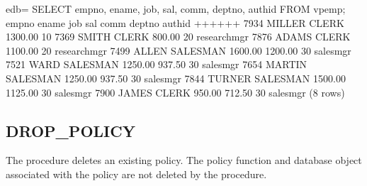 \documentclass[letterpaper,10pt,english,openany,oneside]{sphinxmanual}
\begin{document}
%
\begin{sphinxVerbatim}[commandchars=\\\{\}]
edb=\PYGZsh{} SELECT empno, ename, job, sal, comm, deptno, authid FROM vpemp;
 empno \textbar{} ename  \textbar{}   job    \textbar{}   sal   \textbar{}  comm   \textbar{} deptno \textbar{}   authid
\PYGZhy{}\PYGZhy{}\PYGZhy{}\PYGZhy{}\PYGZhy{}\PYGZhy{}\PYGZhy{}+\PYGZhy{}\PYGZhy{}\PYGZhy{}\PYGZhy{}\PYGZhy{}\PYGZhy{}\PYGZhy{}\PYGZhy{}+\PYGZhy{}\PYGZhy{}\PYGZhy{}\PYGZhy{}\PYGZhy{}\PYGZhy{}\PYGZhy{}\PYGZhy{}\PYGZhy{}\PYGZhy{}+\PYGZhy{}\PYGZhy{}\PYGZhy{}\PYGZhy{}\PYGZhy{}\PYGZhy{}\PYGZhy{}\PYGZhy{}\PYGZhy{}+\PYGZhy{}\PYGZhy{}\PYGZhy{}\PYGZhy{}\PYGZhy{}\PYGZhy{}\PYGZhy{}\PYGZhy{}\PYGZhy{}+\PYGZhy{}\PYGZhy{}\PYGZhy{}\PYGZhy{}\PYGZhy{}\PYGZhy{}\PYGZhy{}\PYGZhy{}+\PYGZhy{}\PYGZhy{}\PYGZhy{}\PYGZhy{}\PYGZhy{}\PYGZhy{}\PYGZhy{}\PYGZhy{}\PYGZhy{}\PYGZhy{}\PYGZhy{}\PYGZhy{}\PYGZhy{}
  7934 \textbar{} MILLER \textbar{} CLERK    \textbar{} 1300.00 \textbar{}         \textbar{}     10 \textbar{}
  7369 \textbar{} SMITH  \textbar{} CLERK    \textbar{}  800.00 \textbar{}         \textbar{}     20 \textbar{} researchmgr
  7876 \textbar{} ADAMS  \textbar{} CLERK    \textbar{} 1100.00 \textbar{}         \textbar{}     20 \textbar{} researchmgr
  7499 \textbar{} ALLEN  \textbar{} SALESMAN \textbar{} 1600.00 \textbar{} 1200.00 \textbar{}     30 \textbar{} salesmgr
  7521 \textbar{} WARD   \textbar{} SALESMAN \textbar{} 1250.00 \textbar{}  937.50 \textbar{}     30 \textbar{} salesmgr
  7654 \textbar{} MARTIN \textbar{} SALESMAN \textbar{} 1250.00 \textbar{}  937.50 \textbar{}     30 \textbar{} salesmgr
  7844 \textbar{} TURNER \textbar{} SALESMAN \textbar{} 1500.00 \textbar{} 1125.00 \textbar{}     30 \textbar{} salesmgr
  7900 \textbar{} JAMES  \textbar{} CLERK    \textbar{}  950.00 \textbar{}  712.50 \textbar{}     30 \textbar{} salesmgr
(8 rows)
\end{sphinxVerbatim}

\newpage

\ignorespaces 

\subsection{DROP\_POLICY}
\label{\detokenize{dbms_rls:drop-policy}}\label{\detokenize{dbms_rls:index-2}}
The  procedure deletes an existing policy. The policy
function and database object associated with the policy are not deleted
by the  procedure.
\end{document}

